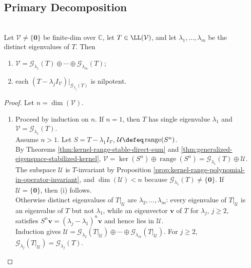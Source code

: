 \subsection{Primary Decomposition}

\begin{theorem} \label{thm:complex-primary-decomposition-generalized-eigenspaces} \\
Let $\mathcal{V}\neq\{\mathbf{0}\}$ be finite-dim over $\mathbb{C}$, let $T\in\LL(\mathcal{V})$, and let $\lambda_1,\ldots,\lambda_m$ be the distinct eigenvalues of $T$. Then
\begin{enumerate}[label=(\roman*)]
\setlength{\itemsep}{0pt}
\item $\mathcal{V}=\mathcal{G}_{\lambda_1}(T)\oplus\cdots\oplus \mathcal{G}_{\lambda_m}(T)$;
\item each $(T-\lambda_jI_{\mathcal{V}})|_{\mathcal{G}_{\lambda_j}(T)}$ is nilpotent.
\end{enumerate}
\begin{proof}
Let $n=\dim(\mathcal{V})$.
\begin{enumerate}[label=(\roman*)]
\setlength{\itemsep}{0pt}
\item
Proceed by induction on $n$. If $n=1$, then $T$ has single eigenvalue $\lambda_1$ and $\mathcal{V}=\mathcal{G}_{\lambda_1}(T)$.\\
Assume $n>1$. Let $S=T-\lambda_1I_{\mathcal{V}}$, $\mathcal{U}\defeq\operatorname{range}(S^n)$.\\
By Theorems \ref{thm:kernel-range-stable-direct-sum} and \ref{thm:generalized-eigenspace-stabilized-kernel}, $\mathcal{V} =\ker(S^n)\oplus\operatorname{range}(S^n) =\mathcal{G}_{\lambda_1}(T)\oplus\mathcal{U}$.
The subspace $\mathcal{U}$ is $T$-invariant by Proposition \ref{prop:kernel-range-polynomial-in-operator-invariant}, and $\dim(\mathcal{U})<n$ because $\mathcal{G}_{\lambda_1}(T)\neq\{\mathbf{0}\}$. If $\mathcal{U}=\{\mathbf{0}\}$, then (i) follows.\\
Otherwise distinct eigenvalues of $T|_{\mathcal{U}}$ are $\lambda_2,\ldots,\lambda_m$: every eigenvalue of $T|_{\mathcal{U}}$ is an eigenvalue of $T$ but not $\lambda_1$, while an eigenvector $\mathbf{v}$ of $T$ for $\lambda_j$, $j\geq2$, satisfies $S^n\mathbf{v}=(\lambda_j-\lambda_1)^n\mathbf{v}$ and hence lies in $\mathcal{U}$.\\
Induction gives $\mathcal{U} =\mathcal{G}_{\lambda_2}(T|_{\mathcal{U}})\oplus\cdots\oplus \mathcal{G}_{\lambda_m}(T|_{\mathcal{U}})$. For $j\geq2$, $\mathcal{G}_{\lambda_j}(T|_{\mathcal{U}})=\mathcal{G}_{\lambda_j}(T)$.\\

\end{enumerate}
\end{proof}
\end{theorem}
